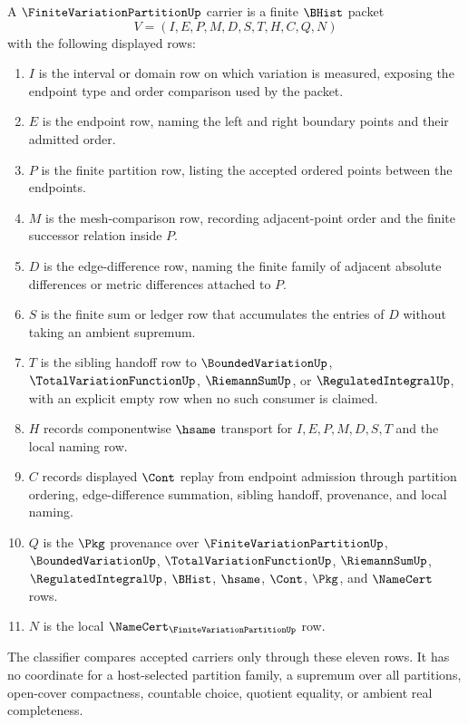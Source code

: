 \begin{definition}
\label{def:finite-variation-partition-carrier}
A $\FiniteVariationPartitionUp$ carrier is a finite $\BHist$ packet
$$
V=(I,E,P,M,D,S,T,H,C,Q,N)
$$
with the following displayed rows:
\begin{enumerate}
\item $I$ is the interval or domain row on which variation is measured, exposing the endpoint type and order comparison used by the packet.
\item $E$ is the endpoint row, naming the left and right boundary points and their admitted order.
\item $P$ is the finite partition row, listing the accepted ordered points between the endpoints.
\item $M$ is the mesh-comparison row, recording adjacent-point order and the finite successor relation inside $P$.
\item $D$ is the edge-difference row, naming the finite family of adjacent absolute differences or metric differences attached to $P$.
\item $S$ is the finite sum or ledger row that accumulates the entries of $D$ without taking an ambient supremum.
\item $T$ is the sibling handoff row to $\BoundedVariationUp$, $\TotalVariationFunctionUp$, $\RiemannSumUp$, or $\RegulatedIntegralUp$, with an explicit empty row when no such consumer is claimed.
\item $H$ records componentwise $\hsame$ transport for $I,E,P,M,D,S,T$ and the local naming row.
\item $C$ records displayed $\Cont$ replay from endpoint admission through partition ordering, edge-difference summation, sibling handoff, provenance, and local naming.
\item $Q$ is the $\Pkg$ provenance over $\FiniteVariationPartitionUp$, $\BoundedVariationUp$, $\TotalVariationFunctionUp$, $\RiemannSumUp$, $\RegulatedIntegralUp$, $\BHist$, $\hsame$, $\Cont$, $\Pkg$, and $\NameCert$ rows.
\item $N$ is the local $\NameCert_{\FiniteVariationPartitionUp}$ row.
\end{enumerate}
The classifier compares accepted carriers only through these eleven rows. It has no coordinate for a host-selected partition family, a supremum over all partitions, open-cover compactness, countable choice, quotient equality, or ambient real completeness.
\end{definition}

